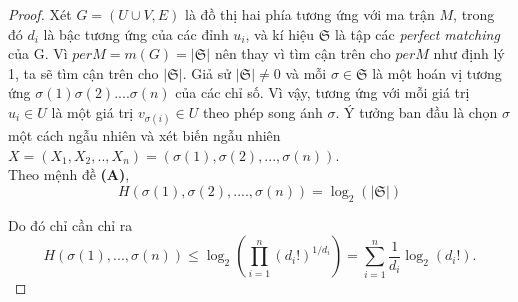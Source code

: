 \documentclass[a4paper, 12pt]{report}
\begin{document}
\begin{proof}
 Xét $G=(U \cup V,E)$ là đồ thị hai phía tương ứng với ma trận $M$, trong đó $d_{i}$ là bậc tương ứng của các đỉnh $u_{i}$, và kí hiệu $\mathfrak{S}$ là tập các \textit{perfect matching} của G. Vì $per M=m(G) = |\mathfrak{S}|$ nên thay vì tìm cận trên cho $per M$ như định lý 1, ta sẽ tìm cận trên cho $|\mathfrak{S}|$. Giả sử $|\mathfrak{S}| \neq 0$ và mỗi $\sigma \in \mathfrak{S}$ là một hoán vị tương ứng $\sigma (1) \sigma (2) ....  \sigma (n)$ của các chỉ số. Vì vậy, tương ứng với mỗi giá trị $u_{i} \in U$ là một giá trị $v_{\sigma(i)} \in U$ theo phép song ánh $\sigma$. Ý tưởng ban đầu là chọn $\sigma$ một cách ngẫu nhiên và xét biến ngẫu nhiên $X=(X_{1},X_{2},..,X_{n}) = (\sigma(1),\sigma(2),...,\sigma(n)).$
\\
Theo mệnh đề \textbf{(A)},
\begin{equation*}
H(\sigma (1), \sigma (2), ....  ,\sigma (n)) = \log_{2}(|\mathfrak{S}|)
\end{equation*}

Do đó chỉ cần chỉ ra
\begin{equation}
    H(\sigma(1),...,\sigma(n)) \leq \log_{2}(\prod_{i=1}^{n}(d_{i}!)^{1/d_{i}}) = \sum_{i=1}^{n}\frac{1}{d_{i}}\log_{2}(d_{i}!).
\end{equation}


\end{proof}
\end{document}
